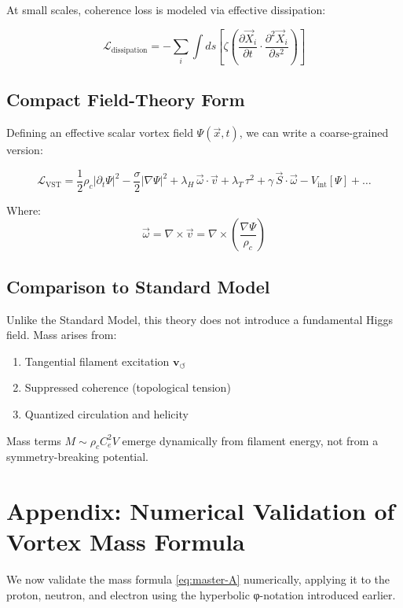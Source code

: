 \documentclass[11pt]{article}
\begin{document}
    At small scales, coherence loss is modeled via effective dissipation:

    \[
        \mathcal{L}_{\text{dissipation}} = -\sum_i \int ds \left[ \zeta \left( \frac{\partial \vec{X}_i}{\partial t} \cdot \frac{\partial^2 \vec{X}_i}{\partial s^2} \right) \right]
    \]

    \subsection{Compact Field-Theory Form}

    Defining an effective scalar vortex field \( \Psi(\vec{x}, t) \), we can write a coarse-grained version:

    \[
        \mathcal{L}_{\text{VST}} = \frac{1}{2} \rho_c \left| \partial_t \Psi \right|^2 - \frac{\sigma}{2} \left| \nabla \Psi \right|^2 + \lambda_H \, \vec{\omega} \cdot \vec{v} + \lambda_T \, \tau^2 + \gamma \, \vec{S} \cdot \vec{\omega} - V_{\text{int}}[\Psi] + \dots
    \]

    Where:
    \[
        \vec{\omega} = \nabla \times \vec{v} = \nabla \times \left( \frac{\nabla \Psi}{\rho_c} \right)
    \]

    \subsection{Comparison to Standard Model}

    Unlike the Standard Model, this theory does not introduce a fundamental Higgs field. Mass arises from:
    \begin{enumerate}
        \item Tangential filament excitation \( \mathbf{v}_{\scriptscriptstyle\boldsymbol{\circlearrowleft}} \)
        \item Suppressed coherence (topological tension)
        \item Quantized circulation and helicity
    \end{enumerate}

    Mass terms \( M \sim \rho_c C_e^2 V \) emerge dynamically from filament energy, not from a symmetry-breaking potential.


    \appendix
    \section*{Appendix: Numerical Validation of Vortex Mass Formula}
    We now validate the mass formula \eqref{eq:master-A} numerically, applying it to the proton, neutron, and electron using the hyperbolic φ-notation introduced earlier.
\end{document}
